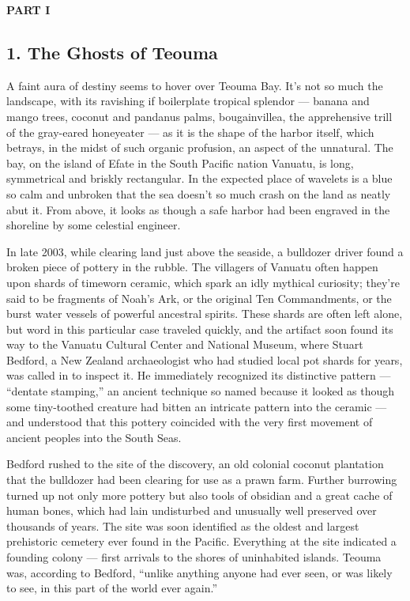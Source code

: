 \textbf{PART I}

\hypertarget{1-the-ghosts-of-teouma}{%
\subsection{\texorpdfstring{\textbf{1. The Ghosts of
Teouma}}{1. The Ghosts of Teouma}}\label{1-the-ghosts-of-teouma}}

A faint aura of destiny seems to hover over Teouma Bay. It's not so much
the landscape, with its ravishing if boilerplate tropical splendor ---
banana and mango trees, coconut and pandanus palms, bougainvillea, the
apprehensive trill of the gray-eared honeyeater --- as it is the shape
of the harbor itself, which betrays, in the midst of such organic
profusion, an aspect of the unnatural. The bay, on the island of Efate
in the South Pacific nation Vanuatu, is long, symmetrical and briskly
rectangular. In the expected place of wavelets is a blue so calm and
unbroken that the sea doesn't so much crash on the land as neatly abut
it. From above, it looks as though a safe harbor had been engraved in
the shoreline by some celestial engineer.

In late 2003, while clearing land just above the seaside, a bulldozer
driver found a broken piece of pottery in the rubble. The villagers of
Vanuatu often happen upon shards of timeworn ceramic, which spark an
idly mythical curiosity; they're said to be fragments of Noah's Ark, or
the original Ten Commandments, or the burst water vessels of powerful
ancestral spirits. These shards are often left alone, but word in this
particular case traveled quickly, and the artifact soon found its way to
the Vanuatu Cultural Center and National Museum, where Stuart Bedford, a
New Zealand archaeologist who had studied local pot shards for years,
was called in to inspect it. He immediately recognized its distinctive
pattern --- ``dentate stamping,'' an ancient technique so named because
it looked as though some tiny-toothed creature had bitten an intricate
pattern into the ceramic --- and understood that this pottery coincided
with the very first movement of ancient peoples into the South Seas.

Bedford rushed to the site of the discovery, an old colonial coconut
plantation that the bulldozer had been clearing for use as a prawn farm.
Further burrowing turned up not only more pottery but also tools of
obsidian and a great cache of human bones, which had lain undisturbed
and unusually well preserved over thousands of years. The site was soon
identified as the oldest and largest prehistoric cemetery ever found in
the Pacific. Everything at the site indicated a founding colony ---
first arrivals to the shores of uninhabited islands. Teouma was,
according to Bedford, ``unlike anything anyone had ever seen, or was
likely to see, in this part of the world ever again.''

